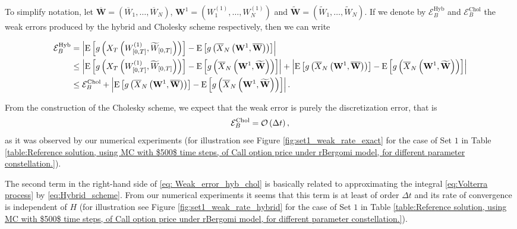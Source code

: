 To simplify notation, let  $\overline{\mathbf{W}}=(\overline{W}_1,\dots,\overline{W}_N)$, $\mathbf{W}^{1}=(W^{(1)}_1,\dots,W^{(1)}_N)$ and $\widetilde{\mathbf{W}}=(\widetilde{W}_1,\dots,\widetilde{W}_N)$. If we denote by $\mathcal{E}_{B}^{\text{Hyb}}$ and $\mathcal{E}_{B}^{\text{Chol}}$ the weak errors produced by the hybrid and Cholesky scheme respectively, then we can write
\begin{small}
\begin{align}\label{eq: Weak_error_hyb_chol}
\mathcal{E}_{B}^{\text{Hyb}}&=\left\lvert\mathrm{E}\left[g\left(X_T\left(W^{(1)}_{[0,T]},\widetilde{W}_{[0,T]}\right) \right)\right]-\mathrm{E}\left[g\left(\overline{X}_N\left(\mathbf{W}^{1}, \overline{\mathbf{W}}\right) \right)\right]\right\rvert \nonumber\\
&\le \left\lvert\mathrm{E}\left[g\left(X_T\left(W^{(1)}_{[0,T]},\widetilde{W}_{[0,T]}\right)\right)\right]-\mathrm{E}\left[g\left(\overline{X}_N\left(\mathbf{W}^{1}, \widetilde{\mathbf{W}}\right)\right)\right]\right\rvert+ \left\lvert \mathrm{E}\left[g\left(\overline{X}_N\left(\mathbf{W}^{1}, \overline{\mathbf{W}}\right)\right)\right]- \mathrm{E}\left[g\left(\overline{X}_N\left(\mathbf{W}^{1}, \widetilde{\mathbf{W}}\right)\right)\right]\right\rvert\nonumber\\
&\le \mathcal{E}_{B}^{\text{Chol}}+ \left\lvert \mathrm{E}\left[g\left(\overline{X}_N\left(\mathbf{W}^{1}, \overline{\mathbf{W}}\right)\right)\right]- \mathrm{E}\left[g\left(\overline{X}_N\left(\mathbf{W}^{1}, \widetilde{\mathbf{W}}\right)\right)\right]\right\rvert.
\end{align}
\end{small}
From the construction of the Cholesky scheme, we expect that the weak error is purely the discretization error, that is
\begin{align*}
\mathcal{E}_{B}^{\text{Chol}}={\mathcal{O}}\left(\Delta t\right),
\end{align*}
as it was observed by our numerical experiments (for illustration see Figure \ref{fig:set1_weak_rate_exact} for the case of Set $1$  in Table \ref{table:Reference solution, using MC with $500$ time steps, of Call option price under rBergomi model, for different parameter constellation.}). 

The second term in the right-hand side of  \eqref{eq: Weak_error_hyb_chol} is basically related to approximating the integral \eqref{eq:Volterra process}  by \eqref{eq:Hybrid_scheme}. From our numerical experiments it seems that this term is  at least  of order  $\Delta t$  and its rate of convergence is independent of $H$ (for illustration see Figure \ref{fig:set1_weak_rate_hybrid} for the case of Set $1$  in Table \ref{table:Reference solution, using MC with $500$ time steps, of Call option price under rBergomi model, for different parameter constellation.}).


